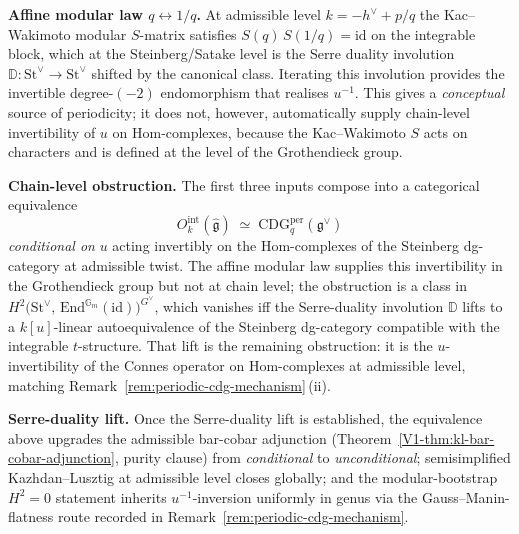 \begin{remark}
\medskip
\noindent\textbf{Affine modular law \(q\leftrightarrow 1/q\).}
At admissible level $k = -h^\vee + p/q$ the Kac--Wakimoto modular
$S$-matrix satisfies
$S(q) \,S(1/q) = \mathrm{id}$ on the integrable block, which at the
Steinberg/Satake level is the Serre duality involution
$\mathbb{D} : \mathrm{St}^\vee \to \mathrm{St}^\vee$
shifted by the canonical class. Iterating this involution provides the
invertible degree-$(-2)$ endomorphism that realises
$u^{-1}$. This gives a \emph{conceptual} source of periodicity; it
does not, however, automatically supply chain-level invertibility of
$u$ on $\mathrm{Hom}$-complexes, because the Kac--Wakimoto $S$ acts on
characters and is defined at the level of the Grothendieck group.

\medskip
\noindent\textbf{Chain-level obstruction.}
The first three inputs compose into a categorical equivalence
\[
O^{\mathrm{int}}_k(\widehat{\mathfrak{g}})
\;\simeq\;
\mathrm{CDG}_q^{\mathrm{per}}(\mathfrak{g}^\vee)
\]
\emph{conditional on} $u$ acting invertibly on the
$\mathrm{Hom}$-complexes of the Steinberg dg-category at admissible
twist. The affine modular law supplies this invertibility in the Grothendieck group
but not at chain level; the obstruction is a class in
$H^2\bigl(\mathrm{St}^\vee,\,
\mathrm{End}^{\mathbb{G}_m}\!(\mathrm{id})\bigr)^{G^\vee}$, which
vanishes iff the Serre-duality involution $\mathbb{D}$ lifts to a
$k[u]$-linear autoequivalence of the Steinberg dg-category
compatible with the integrable $t$-structure. That lift is the
remaining obstruction: it is the $u$-invertibility of the
Connes operator on Hom-complexes at admissible level, matching
Remark~\textup{\ref{rem:periodic-cdg-mechanism}}\,(ii).

\medskip
\noindent\textbf{Serre-duality lift.} Once the
Serre-duality lift is established, the equivalence above upgrades the
admissible bar-cobar adjunction
(Theorem~\ref{V1-thm:kl-bar-cobar-adjunction}, purity clause) from
\emph{conditional} to \emph{unconditional}; semisimplified
Kazhdan--Lusztig at admissible level closes globally; and the
modular-bootstrap $H^2 = 0$ statement inherits $u^{-1}$-inversion
uniformly in genus via the Gauss--Manin-flatness route recorded in
Remark~\textup{\ref{rem:periodic-cdg-mechanism}}.
\end{remark}

